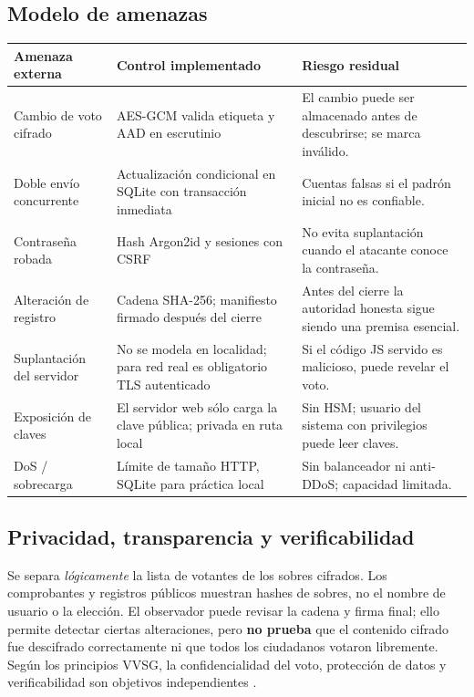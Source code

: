 \subsection{Modelo de amenazas}
\begin{longtable}{p{3.5cm}p{5.4cm}p{4.2cm}}
\toprule Amenaza externa & Control implementado & Riesgo residual\\\midrule\endhead
Cambio de voto cifrado & AES-GCM valida etiqueta y AAD en escrutinio & El cambio puede ser almacenado antes de descubrirse; se marca inválido.\\
Doble envío concurrente & Actualización condicional en SQLite con transacción inmediata & Cuentas falsas si el padrón inicial no es confiable.\\
Contraseña robada & Hash Argon2id y sesiones con CSRF & No evita suplantación cuando el atacante conoce la contraseña.\\
Alteración de registro & Cadena SHA-256; manifiesto firmado después del cierre & Antes del cierre la autoridad honesta sigue siendo una premisa esencial.\\
Suplantación del servidor & No se modela en localidad; para red real es obligatorio TLS autenticado & Si el código JS servido es malicioso, puede revelar el voto.\\
Exposición de claves & El servidor web sólo carga la clave pública; privada en ruta local & Sin HSM; usuario del sistema con privilegios puede leer claves.\\
DoS / sobrecarga & Límite de tamaño HTTP, SQLite para práctica local & Sin balanceador ni anti-DDoS; capacidad limitada.\\
\bottomrule
\end{longtable}

\subsection{Privacidad, transparencia y verificabilidad}
Se separa \emph{lógicamente} la lista de votantes de los sobres cifrados. Los comprobantes y registros públicos muestran hashes de sobres, no el nombre de usuario o la elección. El observador puede revisar la cadena y firma final; ello permite detectar ciertas alteraciones, pero \textbf{no prueba} que el contenido cifrado fue descifrado correctamente ni que todos los ciudadanos votaron libremente. Según los principios VVSG, la confidencialidad del voto, protección de datos y verificabilidad son objetivos independientes \cite{nistvvsg}.

